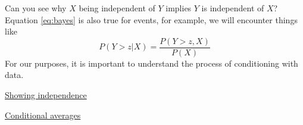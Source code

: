 Can you see why $X$ being independent of $Y$ implies $Y$ is independent of $X$?
Equation \eqref{eq:bayes} is also true for events, for example, we will encounter things like 
\begin{equation}\label{eq:bayes}
P(Y>z|X) = \frac{P(Y>z,X)}{P(X)}
\end{equation}
For our purposes, it is important to understand the process of conditioning with data. 

\begin{example}
\href{https://colab.research.google.com/drive/1Gs-gSsUP1hHVwhrbwvWzLVm1ulcLJKRI#scrollTo=roga82kQRaau}{Showing independence}
\end{example}

\begin{example}
\href{https://colab.research.google.com/drive/1Gs-gSsUP1hHVwhrbwvWzLVm1ulcLJKRI#scrollTo=roga82kQRaau}{Conditional averages}
\end{example}




%
%


